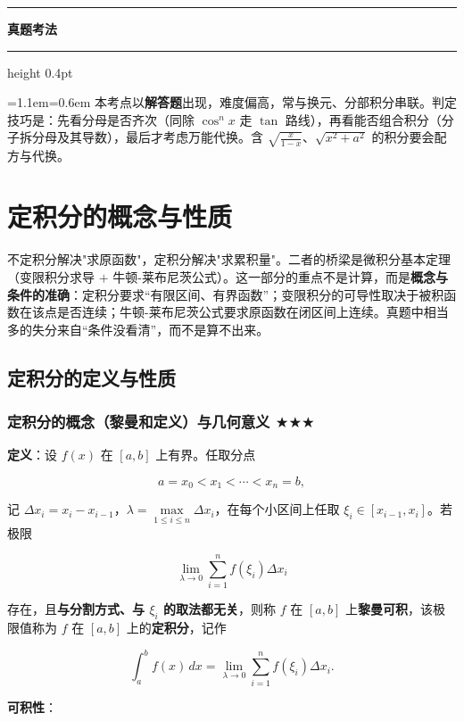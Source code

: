 \documentclass[11pt,openany,UTF8]{ctexbook}
\newcommand{\callouthead}[2]{%
  \par\addvspace{7pt}\noindent
  {\color{#1}\rule[-0.15em]{3pt}{1.05em}}\hspace{0.5em}%
  {\bfseries\color{#1}#2}\par\nobreak\vspace{-0.35em}%
  {\color{rulesep}\hrule height 0.4pt}\nobreak\vspace{0.45em}%
  \begingroup\small\setlength{\parindent}{0pt}%
  \leftskip=1.1em\rightskip=0.6em\noindent\ignorespaces}
\newcommand{\calloutend}{\par\endgroup\addvspace{7pt}}
\newenvironment{callexam}[1]{\callouthead{exambar}{#1}}{\calloutend}
\begin{document}
\begin{callexam}{真题考法}
本考点以\textbf{解答题}出现，难度偏高，常与换元、分部积分串联。判定技巧是：先看分母是否齐次（同除 $\cos^nx$ 走 $\tan$ 路线），再看能否组合积分（分子拆分母及其导数），最后才考虑万能代换。含 $\sqrt{\frac{x}{1-x}}$、$\sqrt{x^2+a^2}$ 的积分要会配方与代换。

\end{callexam}

\section{定积分的概念与性质}

不定积分解决"求原函数"，定积分解决"求累积量"。二者的桥梁是微积分基本定理（变限积分求导 $+$ 牛顿-莱布尼茨公式）。这一部分的重点不是计算，而是\textbf{概念与条件的准确}：定积分要求“有限区间、有界函数”；变限积分的可导性取决于被积函数在该点是否连续；牛顿-莱布尼茨公式要求原函数在闭区间上连续。真题中相当多的失分来自“条件没看清”，而不是算不出来。

\subsection{定积分的定义与性质}

\subsubsection{定积分的概念（黎曼和定义）与几何意义 $\bigstar$$\bigstar$$\bigstar$}

\textbf{定义}：设 $f(x)$ 在 $[a,b]$ 上有界。任取分点

\[a=x_0<x_1<\cdots<x_n=b,\]

记 $\Delta x_i=x_i-x_{i-1}$，$\lambda=\max\limits_{1\leq i\leq n}\Delta x_i$，在每个小区间上任取 $\xi_i\in[x_{i-1},x_i]$。若极限

\[\lim_{\lambda\to 0}\sum_{i=1}^{n}f(\xi_i)\Delta x_i\]

存在，且\textbf{与分割方式、与 $\xi_i$ 的取法都无关}，则称 $f$ 在 $[a,b]$ 上\textbf{黎曼可积}，该极限值称为 $f$ 在 $[a,b]$ 上的\textbf{定积分}，记作

\[\int_a^bf(x)\,dx=\lim_{\lambda\to0}\sum_{i=1}^nf(\xi_i)\Delta x_i.\]

\textbf{可积性}：
\end{document}
